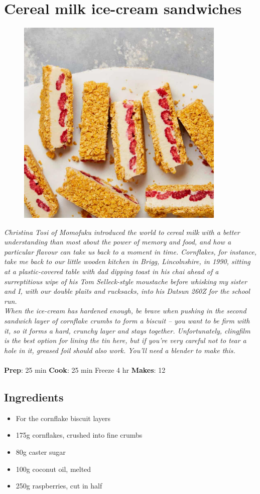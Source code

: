\documentclass{book}
\begin{document}
\section{Cereal milk ice-cream sandwiches}
\begin{figure}
\centering\includegraphics[width=10cm,height=10cm,keepaspectratio]{Recipe_Pictures/Cereal_milk_ice-cream_sandwiches.png}
\end{figure}
\emph{Christina Tosi of Momofuku introduced the world to cereal milk with a better understanding than most about the power of memory and food, and how a particular flavour can take us back to a moment in time. Cornflakes, for instance, take me back to our little wooden kitchen in Brigg, Lincolnshire, in 1990, sitting at a plastic-covered table with dad dipping toast in his chai ahead of a surreptitious wipe of his Tom Selleck-style moustache before whisking my sister and I, with our double plaits and rucksacks, into his Datsun 260Z for the school run.\\ 
When the ice-cream has hardened enough, be brave when pushing in the second sandwich layer of cornflake crumbs to form a biscuit – you want to be firm with it, so it forms a hard, crunchy layer and stays together. Unfortunately, clingfilm is the best option for lining the tin here, but if you’re very careful not to tear a hole in it, greased foil should also work. You’ll need a blender to make this.}\\\\ 
\textbf{Prep}: 25 min
\textbf{Cook}: 25 min Freeze 4 hr
\textbf{Makes}: 12
\subsection*{Ingredients}
\begin{itemize}
\item For the cornflake biscuit layers
\item 175g cornflakes, crushed into fine crumbs
\item 80g caster sugar
\item 100g coconut oil, melted
\item 250g raspberries, cut in half
\end{itemize}
\end{document}
